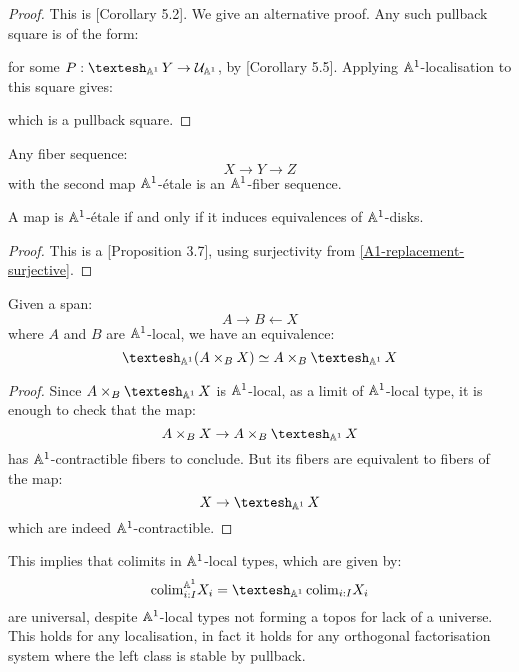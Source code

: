 \begin{proof}
This is \cite{cherubini_rijke_2021}[Corollary 5.2]. We give an alternative proof. Any such pullback square is of the form:
  \begin{center}
  \end{center}
for some $P: \shape_{\A^1}Y \to {\mathcal U}_{\A^1}$, by \cite{cherubini_rijke_2021}[Corollary 5.5]. Applying $\mathbb{A}^1$-localisation to this square gives:
  \begin{center}
  \end{center}
  which is a pullback square.
\end{proof}

\begin{corollary}
Any fiber sequence:
\[X\to Y\to Z\]
with the second map $\mathbb{A}^1$-étale is an $\mathbb{A}^1$-fiber sequence.
\end{corollary}

\begin{lemma}
A map is $\mathbb{A}^1$-étale if and only if it induces equivalences of $\mathbb{A}^1$-disks. 
\end{lemma}

\begin{proof}
This is a \cite{cherubini_rijke_2021}[Proposition 3.7], using surjectivity from \cref{A1-replacement-surjective}.
\end{proof}

\begin{lemma}
Given a span:
\[ A \to B \leftarrow X\]
where $A$ and $B$ are $\mathbb{A}^1$-local, we have an equivalence:
\[\shape_{\A^1} (A\times_BX) \simeq A\times_B\shape_{\A^1}X\]
\end{lemma}

\begin{proof}
Since $A\times_B\shape_{\A^1}X$ is $\mathbb{A}^1$-local, as a limit of $\mathbb{A}^1$-local type, it is enough to check that the map:
\[A\times_BX \to A\times_B\shape_{\A^1}X\]
has $\mathbb{A}^1$-contractible fibers to conclude. But its fibers are equivalent to fibers of the map:
\[X\to \shape_{\A^1}X\]
which are indeed $\mathbb{A}^1$-contractible.
\end{proof}

\begin{remark}
This implies that colimits in $\mathbb{A}^1$-local types, which are given by: 
\[\mathrm{colim}^{\A^1}_{i:I} X_i =  \shape_{\A^1} \mathrm{colim}_{i:I}X_i\]
are universal, despite $\mathbb{A}^1$-local types not forming a topos for lack of a universe. This holds for any localisation, in fact it holds for any orthogonal factorisation system where the left class is stable by pullback. 
\end{remark}